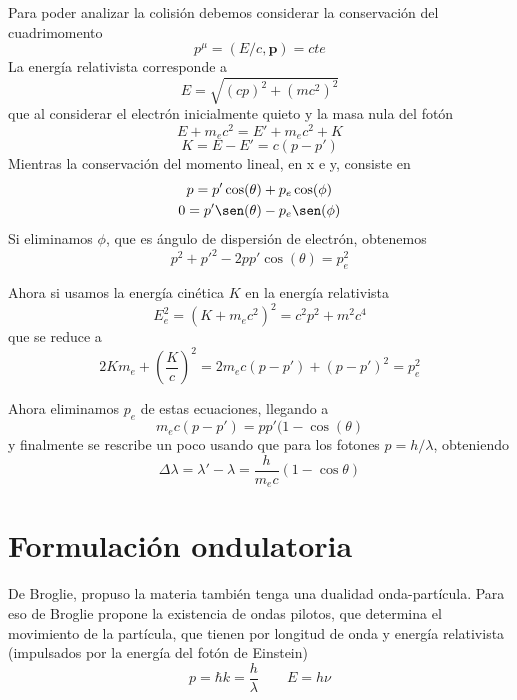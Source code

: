 \documentclass{book}
\numberwithin{equation}{section} %
\begin{document}
Para poder analizar la colisión debemos considerar la conservación del cuadrimomento
\[ p^\mu = (E/c, \textbf{p}) = cte\]
La energía relativista corresponde a
\[ E = \sqrt{(cp)^2 + (m c^2)^2} \]
que al considerar el electrón inicialmente quieto y la masa nula del fotón
\[E + m_e c^2 = E' + m_e c^2 + K \]
\[K = E - E' = c (p - p') \]
Mientras la conservación del momento lineal, en x e y, consiste en
\begin{gather*}
    p = p' \cos(\theta) + p_e \cos(\phi)\\
    0 = p' \sen(\theta) - p_e \sen(\phi)
\end{gather*}
Si eliminamos $\phi$, que es ángulo de dispersión de electrón, obtenemos
\[p^2 + p'^2 - 2 p p' \cos(\theta) = p^2_e \]

Ahora si usamos la energía cinética $K$ en la energía relativista
\[ E_e^2 = (K + m_e c^2)^2 = c^2 p^2 + m^2 c^4\]
que se reduce a
\[ 2 K m_e + \left(\frac{K}{c}\right)^2 = 2 m_e c (p - p') + (p - p')^2 = p_e^2\]

Ahora eliminamos $p_e$ de estas ecuaciones, llegando a
\[m_e c (p - p') = p p' (1 - \cos(\theta)\]
y finalmente se rescribe un poco usando que para los fotones $p = h/\lambda$, obteniendo
\begin{equation}
    \Delta \lambda = \lambda' - \lambda = \frac{h}{m_e c} \left(1-\cos \theta \right)
\end{equation}

\section{Formulación ondulatoria}

De Broglie, propuso la materia también tenga una dualidad onda-partícula.
Para eso de Broglie propone la existencia de ondas pilotos, que determina el movimiento de la partícula, que tienen por longitud de onda y energía relativista (impulsados por la energía del fotón de Einstein)
\begin{equation}
    p = \hbar k = \frac{h}{\lambda} \qquad E = h\nu
\end{equation}
\end{document}
